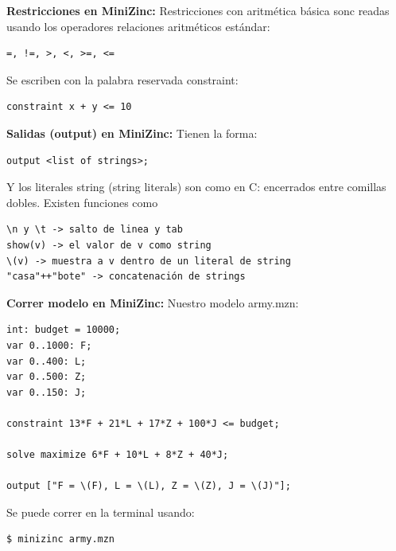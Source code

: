\documentclass[12pt]{article}
\begin{document}
\begin{justify}
\textbf{Restricciones en MiniZinc:} Restricciones con aritmética básica sonc readas usando los operadores relaciones aritméticos estándar: \begin{verbatim}
=, !=, >, <, >=, <=
\end{verbatim}
Se escriben con la palabra reservada constraint:
\end{justify}
\begin{Verbatim}
constraint x + y <= 10
\end{Verbatim}

\begin{justify}
\textbf{Salidas (output) en MiniZinc:} Tienen la forma:
\end{justify}
\begin{Verbatim}
output <list of strings>;
\end{Verbatim}

\begin{justify}
Y los literales string (string literals) son como en C: encerrados entre comillas dobles. Existen funciones como \begin{Verbatim}
\n y \t -> salto de linea y tab
show(v) -> el valor de v como string
\(v) -> muestra a v dentro de un literal de string
"casa"++"bote" -> concatenación de strings
\end{Verbatim} 
\end{justify}

\begin{justify}
\textbf{Correr modelo en MiniZinc:} Nuestro modelo army.mzn:
\end{justify}

\begin{Verbatim}
int: budget = 10000;
var 0..1000: F;
var 0..400: L;
var 0..500: Z;
var 0..150: J;

constraint 13*F + 21*L + 17*Z + 100*J <= budget;

solve maximize 6*F + 10*L + 8*Z + 40*J;

output ["F = \(F), L = \(L), Z = \(Z), J = \(J)"];

\end{Verbatim}

\begin{justify}
Se puede correr en la terminal usando:
\end{justify}

\begin{Verbatim}
$ minizinc army.mzn
\end{Verbatim}
\end{document}

